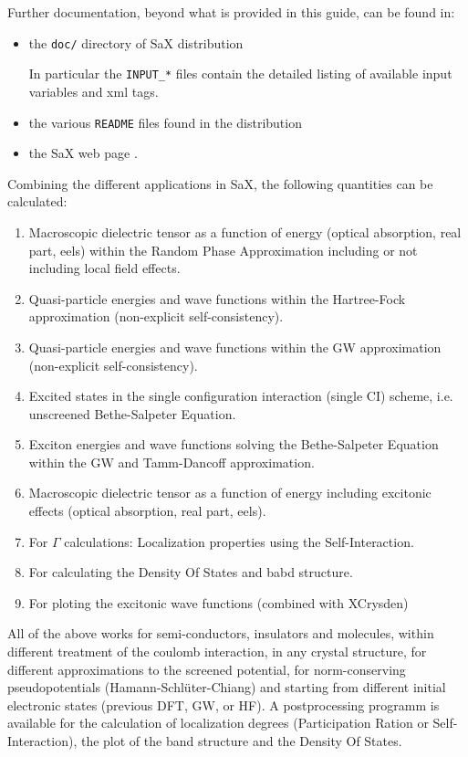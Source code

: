 \documentclass[11pt]{article}
\begin{document}
Further documentation, beyond what is provided in this guide, can be
found in:
\begin{itemize}
  \item the \texttt{doc/} directory of SaX distribution

        In particular the \texttt{INPUT\_*} files contain the detailed
        listing of available input variables and xml tags.
  \item the various \texttt{README} files found in the distribution
  \item the SaX web page \SAXURL.
\end{itemize}
%

Combining the different applications in SaX, the following quantities can be calculated:

\begin{enumerate}
  \item Macroscopic dielectric tensor as a function of energy (optical absorption, real part, eels) within the Random Phase Approximation including or not including local field effects.
  \item Quasi-particle energies and wave functions within the Hartree-Fock approximation (non-explicit self-consistency).
  \item Quasi-particle energies and wave functions within the GW approximation (non-explicit self-consistency).
  \item Excited states in the single configuration interaction (single CI) scheme, i.e. unscreened Bethe-Salpeter Equation.
  \item Exciton energies and wave functions solving the Bethe-Salpeter Equation within the GW and Tamm-Dancoff approximation.
  \item Macroscopic dielectric tensor as a function of energy including excitonic effects (optical absorption, real part, eels).
  \item For $\Gamma$ calculations: Localization properties using the Self-Interaction.
  \item For calculating the Density Of States and babd structure.
  \item For ploting the excitonic wave functions (combined with XCrysden)
\end{enumerate}
All of the above works for semi-conductors, insulators and molecules, within different treatment of the coulomb interaction, in any crystal
structure, for different approximations to the screened potential, for norm-conserving pseudopotentials (Hamann-Schl\"uter-Chiang) and starting from different initial electronic states (previous DFT, GW, or HF). A postprocessing programm is available for the calculation of localization degrees (Participation Ration or Self-Interaction), the plot of the band structure and the Density Of States.
\end{document}
